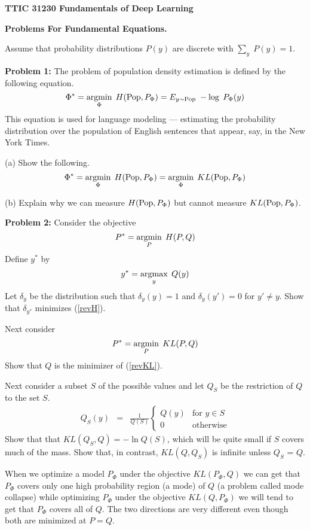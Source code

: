 \documentclass{article}
\begin{document}
\centerline{\bf TTIC 31230 Fundamentals of Deep Learning}
\centerline{\bf Problems For Fundamental Equations.}

\vfill
\vfill
Assume that probability distributions $P(y)$ are discrete with $\sum_y\;P(y) = 1$.

\bigskip
{\bf Problem 1:} The problem of population density estimation is defined by the following equation.
$$\Phi^* = \operatorname*{argmin}_\Phi\;H(\mathrm{Pop},P_\Phi) = E_{y \sim \mathrm{Pop}}\;-\log\;P_\Phi(y)$$
This equation is used for language modeling --- estimating the probability distribution over the population of English sentences that appear, say, in the New York Times.

\medskip
(a) Show the following.
$$\Phi^* = \operatorname*{argmin}_\Phi\;H(\mathrm{Pop},P_\Phi) = \operatorname*{argmin}_\Phi \;KL(\mathrm{Pop},P_\Phi)$$

(b) Explain why we can measure $H(\mathrm{Pop},P_\Phi)$ but cannot measure $KL(\mathrm{Pop},P_\Phi)$.


\bigskip
{\bf Problem 2:} Consider the objective
\begin{equation}
  \label{revH}
  P^* = \operatorname*{argmin}_P\;H(P,Q)
\end{equation}
Define $y^*$ by
$$y^* = \operatorname*{argmax}_y\;Q(y)$$
Let $\delta_y$ be the distribution such that $\delta_y(y) = 1$ and $\delta_y(y') = 0$ for $y' \not = y$.
Show that $\delta_{y^*}$ minimizes (\ref{revH}).

Next consider
\begin{equation}
  \label{revKL}
  P^* = \operatorname*{argmin}_P\;KL(P,Q)
\end{equation}
Show that $Q$ is the minimizer of (\ref{revKL}).

Next consider a subset $S$ of the possible values and let $Q_S$ be the restriction of $Q$ to the set $S$.
\begin{eqnarray*}
  Q_S(y) & = & \frac{1}{Q(S)}\left\{\begin{array}{ll} Q(y) & \mbox{for $y \in S$} \\ 0 & \mbox{otherwise} \end{array}\right.
\end{eqnarray*}
Show that that $KL(Q_S,Q) = -\ln Q(S)$, which will be quite small if $S$ covers much of the mass. Show that, in contrast, $KL(Q,Q_S)$ is infinite unless
$Q_S$ = $Q$.

When we optimize a model $P_\Phi$ under the objective $KL(P_\Phi,Q)$ we can get that $P_\Phi$ covers only one high probability region (a mode) of $Q$ (a problem called mode collapse)
while optimizing $P_\Phi$ under the objective $KL(Q,P_\Phi)$ we will tend to get that $P_\Phi$ covers all of $Q$.  The two directions are very different even though both
are minimized at $P = Q$.
\end{document}
